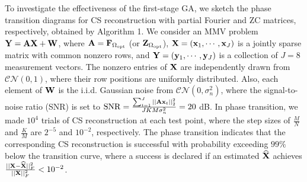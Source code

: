\documentclass[journal]{IEEEtran}
\newcommand{\nbu}{{\bf n}}
\newcommand{\xbu}{{\bf x}}
\newcommand{\ybu}{{\bf y}}
\newcommand{\Abu}{{\bf A}}
\newcommand{\Fbu}{{\bf F}}
\newcommand{\Wbu}{{\bf W}}
\newcommand{\Xbu}{{\bf X}}
\newcommand{\Ybu}{{\bf Y}}
\newcommand{\Zbu}{{\bf Z}}
\numberwithin{const2}{const}
\begin{document}
To investigate the effectiveness of the first-stage GA,
we sketch the phase transition diagrams for 
CS reconstruction with partial Fourier and ZC matrices, respectively,
obtained by Algorithm 1. 
We consider an MMV problem $\Ybu = \Abu \Xbu + \Wbu$,
where $ \Abu =  \Fbu_{\Omega_{\rm opt}}$ (or $ \Zbu_{\Omega_{\rm opt}}$),
$\Xbu = (\xbu_1, \cdots, \xbu_J)$ is a jointly sparse matrix 
with common nonzero rows, and 
$\Ybu = (\ybu_1, \cdots, \ybu_J)$ is a collection of $J=8$ measurement vectors. 
The nonzero entries of $\Xbu$ are independently drawn from $\mathcal{CN} (0, 1)$,
where their row positions are uniformly distributed.
Also, each element of $\Wbu$ is the i.i.d. Gaussian noise from $\mathcal{CN} (0, \sigma_n ^2)$,
where the signal-to-noise ratio (SNR) is set to 
${\rm SNR} = \frac{\sum_{t=1} ^J|| \Abu \xbu_t ||_2 ^2}{J K M \sigma_n ^2} = 20$ dB.
In phase transition, we made $10^4$ trials of CS reconstruction
at each test point,
where the step sizes of $\frac{M}{N}$ and $\frac{K}{M}$ are $2^{-5}$ and $10^{-2}$, respectively.
The phase transition
indicates that the corresponding CS reconstruction is successful with 
probability exceeding $99 \%$ below the transition curve, where
a success is declared %
if an estimated $\widehat{\Xbu}$
achieves $\frac{|| \Xbu - \widehat{\Xbu}||_F ^2}{|| \Xbu||_F ^2} < 10^{-2}$.
\end{document}
